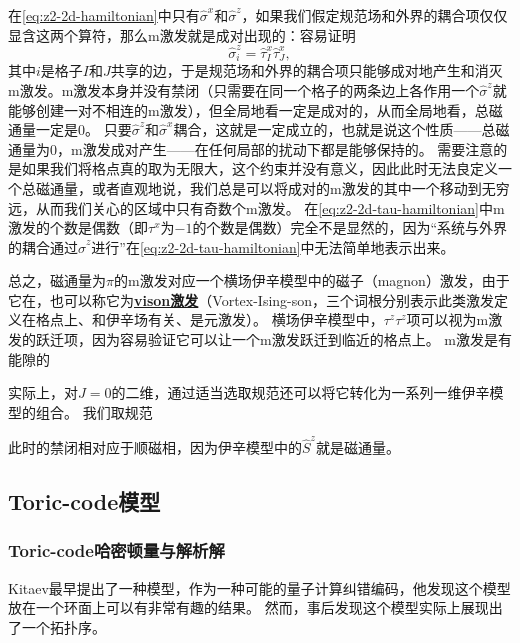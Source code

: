 \documentclass[hyperref, UTF8, a4paper]{ctexart}
\newcommand*{\concept}[1]{\underline{\textbf{#1}}}
\newcommand*{\Ztwo}{$\mathbb{Z}_2$}
\begin{document}
在\eqref{eq:z2-2d-hamiltonian}中只有$\hat{\sigma}^x$和$\hat{\sigma}^z$，如果我们假定规范场和外界的耦合项仅仅显含这两个算符，那么m激发就是成对出现的：容易证明
\[
    \hat{\sigma}^z_i = \hat{\tau}^x_I \hat{\tau}^x_J,
\]
其中$i$是格子$I$和$J$共享的边，于是规范场和外界的耦合项只能够成对地产生和消灭m激发。m激发本身并没有禁闭（只需要在同一个格子的两条边上各作用一个$\hat{\sigma}^z$就能够创建一对不相连的m激发），但全局地看一定是成对的，从而全局地看，总磁通量一定是$0$。
只要$\hat{\sigma}^z$和$\hat{\sigma}^x$耦合，这就是一定成立的，也就是说这个性质——总磁通量为$0$，m激发成对产生——在任何局部的扰动下都是能够保持的。
需要注意的是如果我们将格点真的取为无限大，这个约束并没有意义，因此此时无法良定义一个总磁通量，或者直观地说，我们总是可以将成对的m激发的其中一个移动到无穷远，从而我们关心的区域中只有奇数个m激发。
在\eqref{eq:z2-2d-tau-hamiltonian}中m激发的个数是偶数（即$\tau^x$为$-1$的个数是偶数）完全不是显然的，因为“系统与外界的耦合通过$\hat{\sigma}^z$进行”在\eqref{eq:z2-2d-tau-hamiltonian}中无法简单地表示出来。

总之，磁通量为$\pi$的m激发对应一个横场伊辛模型中的磁子（magnon）激发，由于它在，也可以称它为\concept{vison激发}（Vortex-Ising-son，三个词根分别表示此类激发定义在格点上、和伊辛场有关、是元激发）。
横场伊辛模型中，$\tau^z \tau^z$项可以视为m激发的跃迁项，因为容易验证它可以让一个m激发跃迁到临近的格点上。
m激发是有能隙的

实际上，对$J=0$的二维，通过适当选取规范还可以将它转化为一系列一维伊辛模型的组合。
我们取规范

此时的禁闭相对应于顺磁相，因为伊辛模型中的$\hat{S}^z$就是磁通量。

\subsection{Toric-code模型}

\subsubsection{Toric-code哈密顿量与解析解}

Kitaev最早提出了一种模型，作为一种可能的量子计算纠错编码，他发现这个模型放在一个环面上可以有非常有趣的结果。
然而，事后发现这个模型实际上展现出了一个拓扑序。
\end{document}
